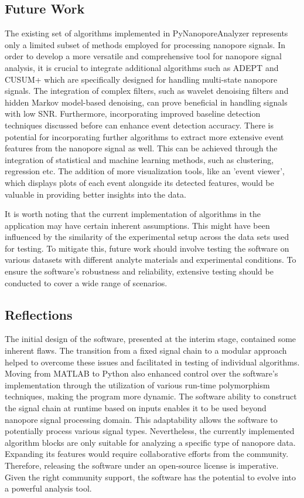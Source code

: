 \documentclass[journal]{IEEEtran}
\begin{document}
\subsection{Future Work}
The existing set of algorithms implemented in PyNanoporeAnalyzer represents only a limited subset of methods employed for processing nanopore signals. In order to develop a more versatile and comprehensive tool for nanopore signal analysis, it is crucial to integrate additional algorithms such as ADEPT and CUSUM+ which are specifically designed for handling multi-state nanopore signals. The integration of complex filters, such as wavelet denoising filters and hidden Markov model-based denoising, can prove beneficial in handling signals with low SNR. Furthermore, incorporating improved baseline detection techniques discussed before \cite{plesaDataAnalysisMethods2015,varongchayakulSinglemoleculeProteinSensing2018} can enhance event detection accuracy. There is potential for incorporating further algorithms to extract more extensive event features from the nanopore signal as well. This can be achieved through the integration of statistical and machine learning methods, such as clustering, regression etc. The addition of more visualization tools, like an 'event viewer', which displays plots of each event alongside its detected features, would be valuable in providing better insights into the data.

It is worth noting that the current implementation of algorithms in the application may have certain inherent assumptions. This might have been influenced by the similarity of the experimental setup across the data sets used for testing. To mitigate this, future work should involve testing the software on various datasets with different analyte materials and experimental conditions. To ensure the software's robustness and reliability, extensive testing should be conducted to cover a wide range of scenarios.

\subsection{Reflections}
The initial design of the software, presented at the interim stage, contained some inherent flaws. The transition from a fixed signal chain to a modular approach helped to overcome these issues and facilitated in testing of individual algorithms. Moving from MATLAB to Python also enhanced control over the software's implementation through the utilization of various run-time polymorphism techniques, making the program more dynamic. The software ability to construct the signal chain at runtime based on inputs enables it to be used beyond nanopore signal processing domain. This adaptability allows the software to potentially process various signal types. Nevertheless, the currently implemented algorithm blocks are only suitable for analyzing a specific type of nanopore data. Expanding its features would require collaborative efforts from the community. Therefore, releasing the software under an open-source license is imperative. Given the right community support, the software has the potential to evolve into a powerful analysis tool.
\end{document}
